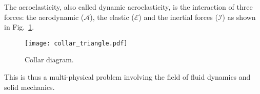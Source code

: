 
The aeroelasticity, also called dynamic aeroelasticity,
is the interaction of three forces:
the aerodynamic ($\mathcal{A}$), the elastic ($\mathcal{E}$) and
the inertial forces ($\mathcal{I}$) as 
shown in Fig.~\ref{fig:ael_collar_triangle}. 
\begin{figure}[htb]
  \centering
  \texttt{[image: collar\_triangle.pdf]}
  \caption{Collar diagram.}
  \label{fig:ael_collar_triangle}
\end{figure} 
This is thus a 
multi-physical problem involving the field of fluid dynamics and
solid mechanics. 